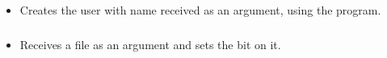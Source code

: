 \begin{itemize}[label={}]
    \item Creates the user with name received as an argument, using the  program.
\end{itemize}

\subsubsection*{}\label{subsec:Setuid}

\begin{itemize}[label={}]
    \item Receives a file as an argument and sets the  bit on it.
\end{itemize}
